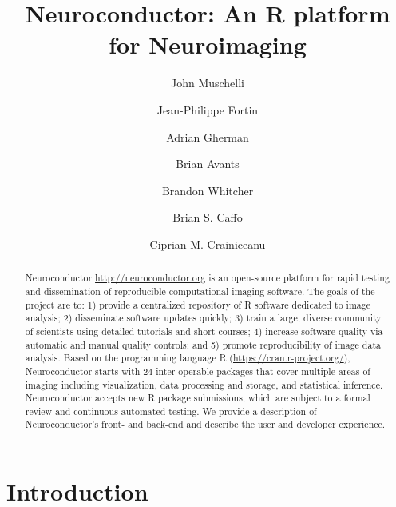 \documentclass[]{elsarticle} %
\begin{document}
\begin{frontmatter}

  \title{Neuroconductor: An R platform for Neuroimaging}
    \author[JHU]{John Muschelli}
    \author[Penn]{Jean-Philippe Fortin}
  
    \author[JHU]{Adrian Gherman}
   \author[]{Brian Avants}
   
   \author[]{Brandon Whitcher}
   
    \author[JHU]{Brian S. Caffo}
  
    \author[JHU]{Ciprian M. Crainiceanu}
  
      \address[JHU]{Johns Hopkins Bloomberg School of Public Health, Department of
Biostatistics, 615 N Wolfe St, Baltimore, MD, 21205}
    \address[Penn]{Perelman School of Medicine, University of Pennsylvania, Department of
Biostatistics and Epidemiology, 423 Guardian Drive, Philadelphia, PA
19104}
  
  \begin{abstract}
Neuroconductor \url{http://neuroconductor.org}  is an open-source platform for rapid testing and dissemination of reproducible computational imaging software. The goals of the project are to: 1) provide a centralized repository of R software dedicated to image analysis; 2) disseminate  software updates quickly; 3) train a large, diverse community of scientists using detailed tutorials and short courses; 4) increase software quality via automatic and manual quality controls; and 5) promote reproducibility of image data analysis. Based on the  programming language R (\url{https://cran.r-project.org/}), Neuroconductor starts with 24 inter-operable packages that cover multiple areas of imaging including visualization, data processing and storage, and statistical inference. Neuroconductor accepts new R package submissions, which are subject to a formal review and continuous automated testing. We provide a description of Neuroconductor's front- and back-end  and describe the user and developer experience.  
  \end{abstract}
 
 \end{frontmatter}

\section{Introduction}\label{introduction}
\end{document}
